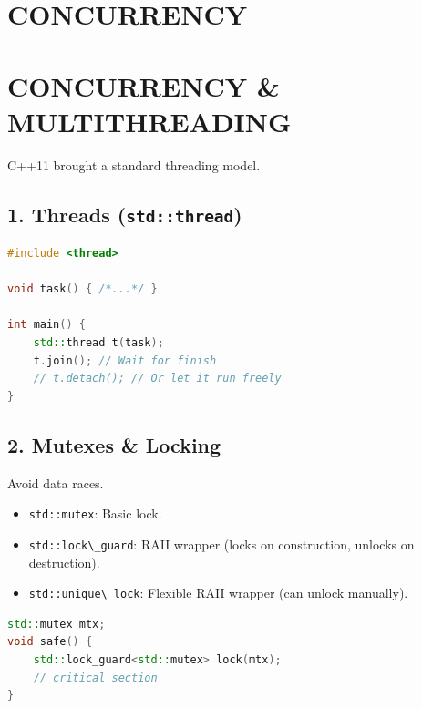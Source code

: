 \hypertarget{concurrency}{%
\chapter{CONCURRENCY}\label{concurrency}}

\hypertarget{concurrency-multithreading}{%
\chapter{CONCURRENCY \&
MULTITHREADING}\label{concurrency-multithreading}}

C++11 brought a standard threading model.

\hypertarget{threads-stdthread}{%
\section{\texorpdfstring{1. Threads
(\texttt{std::thread})}{1. Threads (std::thread)}}\label{threads-stdthread}}

\begin{lstlisting}[language={C++}]
#include <thread>

void task() { /*...*/ }

int main() {
    std::thread t(task);
    t.join(); // Wait for finish
    // t.detach(); // Or let it run freely
}
\end{lstlisting}

\hypertarget{mutexes-locking}{%
\section{2. Mutexes \& Locking}\label{mutexes-locking}}

Avoid data races.

\begin{itemize}
\tightlist
\item
  \passthrough{\lstinline!std::mutex!}: Basic lock.
\item
  \passthrough{\lstinline!std::lock\_guard!}: RAII wrapper (locks on
  construction, unlocks on destruction).
\item
  \passthrough{\lstinline!std::unique\_lock!}: Flexible RAII wrapper
  (can unlock manually).
\end{itemize}

\begin{lstlisting}[language={C++}]
std::mutex mtx;
void safe() {
    std::lock_guard<std::mutex> lock(mtx);
    // critical section
}
\end{lstlisting}

